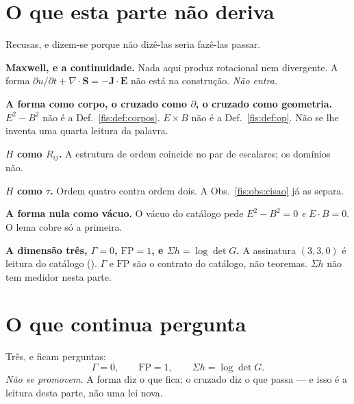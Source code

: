 \documentclass[livro.tex]{subfiles}
\begin{document}
\section{O que esta parte não deriva}\label{fis:em-naoderiva}

\noindent Recusas, e dizem-se porque não dizê-las seria fazê-las passar.

\medskip\noindent\textbf{Maxwell, e a continuidade.} Nada aqui produz
rotacional nem divergente. A forma
$\partial u/\partial t+\nabla\cdot\mathbf{S}=-\mathbf{J}\cdot\mathbf{E}$
não está na construção. \emph{Não entra.}

\medskip\noindent\textbf{A forma como corpo, o cruzado como $\partial$, o
cruzado como geometria.} $E^{2}-B^{2}$ não é a Def.~\ref{fis:def:corpos}.
$E\times B$ não é a Def.~\ref{fis:def:op}. Não se lhe inventa uma quarta
leitura da palavra.

\medskip\noindent\textbf{$H$ como $R_{ij}$.} A estrutura de ordem coincide no
par de escalares; os domínios não.

\medskip\noindent\textbf{$H$ como $\tau$.} Ordem quatro contra ordem dois. A
Obs.~\ref{fis:obs:cisao} já as separa.

\medskip\noindent\textbf{A forma nula como vácuo.} O vácuo do catálogo pede
$E^{2}-B^{2}=0$ \emph{e} $E\cdot B=0$. O lema cobre só a primeira.

\medskip\noindent\textbf{A dimensão três, $\Gamma=0$, $\mathrm{FP}=1$, e
$\Sigma h=\log\det G$.} A assinatura $(3,3,0)$ é leitura do catálogo
(). $\Gamma$ e $\mathrm{FP}$ são o contrato
do catálogo, não teoremas. $\Sigma h$ não tem medidor nesta parte.

\section{O que continua pergunta}\label{fis:em-pergunta}

\noindent Três, e ficam perguntas:
\[
\Gamma=0,\qquad \mathrm{FP}=1,\qquad \Sigma h=\log\det G.
\]
\emph{Não se promovem.} A forma diz o que fica; o cruzado diz o que passa ---
e isso é a leitura desta parte, não uma lei nova.

\end{document}
